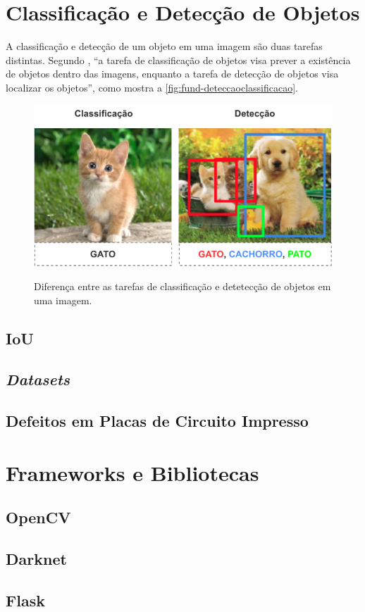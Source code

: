 \section{Classificação e Detecção de Objetos} \label{cap:fund-objetos}

A classificação e detecção de um objeto em uma imagem são duas tarefas distintas. Segundo , ``a tarefa de classificação de objetos visa prever a existência de objetos dentro das imagens, enquanto a tarefa de detecção de objetos visa localizar os objetos'', como mostra a \autoref{fig:fund-deteccaoclassificacao}.

\begin{figure}[h!] %
  \centering
  \caption{Diferença entre as tarefas de classificação e detetecção de objetos em uma imagem.}
  \includegraphics[scale=1.1]{img/img-fundamentacao-deteccaoclassificacao.pdf}
  \label{fig:fund-deteccaoclassificacao}
\end{figure}


\subsection{IoU} \label{cap:fund-objetos-iou}
\subsection{\textit{Datasets}} \label{cap:fund-objetos-data}
\subsection{Defeitos em Placas de Circuito Impresso} \label{cap:fund-objetos-defeitos}
\section{Frameworks e Bibliotecas} \label{cap:fund-frameworks}
\subsection{OpenCV} \label{cap:fund-frameworks-opencv}
\subsection{Darknet} \label{cap:fund-frameworks-darknet}
\subsection{Flask} \label{cap:fund-frameworks-flask}
